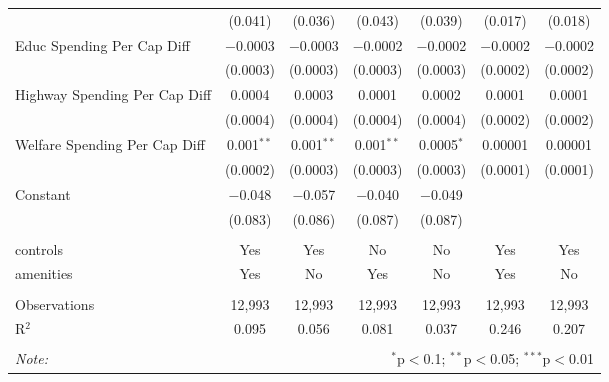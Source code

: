 \begin{table}[!htbp]
\begin{tabular}{@{\extracolsep{5pt}}lcccccc}
  & (0.041) & (0.036) & (0.043) & (0.039) & (0.017) & (0.018) \\ 
  Educ Spending Per Cap Diff & $-$0.0003 & $-$0.0003 & $-$0.0002 & $-$0.0002 & $-$0.0002 & $-$0.0002 \\ 
  & (0.0003) & (0.0003) & (0.0003) & (0.0003) & (0.0002) & (0.0002) \\ 
  Highway Spending Per Cap Diff & 0.0004 & 0.0003 & 0.0001 & 0.0002 & 0.0001 & 0.0001 \\ 
  & (0.0004) & (0.0004) & (0.0004) & (0.0004) & (0.0002) & (0.0002) \\ 
  Welfare Spending Per Cap Diff & 0.001$^{**}$ & 0.001$^{**}$ & 0.001$^{**}$ & 0.0005$^{*}$ & 0.00001 & 0.00001 \\ 
  & (0.0002) & (0.0003) & (0.0003) & (0.0003) & (0.0001) & (0.0001) \\ 
  Constant & $-$0.048 & $-$0.057 & $-$0.040 & $-$0.049 &  &  \\ 
  & (0.083) & (0.086) & (0.087) & (0.087) &  &  \\ 
 \hline \\[-1.8ex] 
controls & Yes & Yes & No & No & Yes & Yes \\ 
amenities & Yes & No & Yes & No & Yes & No \\ 
\hline \\[-1.8ex] 
Observations & 12,993 & 12,993 & 12,993 & 12,993 & 12,993 & 12,993 \\ 
R$^{2}$ & 0.095 & 0.056 & 0.081 & 0.037 & 0.246 & 0.207 \\ 
\hline 
\hline \\[-1.8ex] 
\textit{Note:}  & \multicolumn{6}{r}{$^{*}$p$<$0.1; $^{**}$p$<$0.05; $^{***}$p$<$0.01} \\ 
\end{tabular} 
\end{table} 
